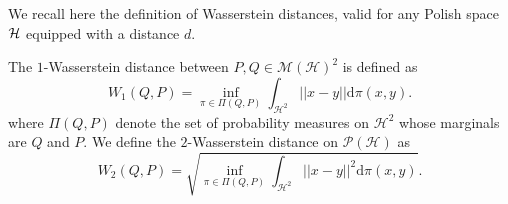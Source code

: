 \begin{noaddcontents}
    We recall here the definition of Wasserstein distances, valid for any Polish space $\mathcal{H}$ equipped with a distance $d$.
    
    \begin{definition}
    \label{def: wasserstein-chap-4}
    The $1$-Wasserstein distance between $P,Q \in \mathcal{M}(\mathcal{H})^2$ is defined as
    \[ W_1(Q,P) = \inf_{\pi \in \Pi(Q,P)} \int_{\mathcal{H}^2} ||x-y||\mathrm{d}\pi(x,y). \]
    where $\Pi(Q,P)$ denote the set of probability measures on $\mathcal{H}^2$ whose marginals are $Q$ and $P$.
    We define the $2$-Wasserstein distance on $\mathcal{P}(\mathcal{H})$ as
    \[ W_2(Q,P) = \sqrt{\inf_{\pi \in \Pi(Q,P)} \int_{\mathcal{H}^2} ||x-y||^2\mathrm{d}\pi(x,y)}. \]
    \end{definition}
    \begin{comment}
    \subsection{Stochastic Gradient Descent.}
    \begin{algorithm}[htbp]
      \begin{algorithmic}[1]
      \State \textbf{Input:} Initial point $\mathbf{h}_1=0$, steps $(\eta_t)_{t\geq 1}$, dataset $\S$\\
      \textbf{For $t=1\cdots T$:}
      \State \hspace{0.7cm}Draw $j_t\sim Unif\LP\LC 1 \cdots m\RC \RP$
      \State \hspace{0.7cm}Update $\mathbf{h}_{t+1} = \mathbf{h}_t - \eta_t \nabla_h\ell(\mathbf{h}_t,\z_{j_t})$
      \State \textbf{return} $\mathbf{h}_{T+1}$
      \end{algorithmic}
      \caption{Stochastic Gradient Descent}
      \label{alg:sgd}
      \end{algorithm}
    

\end{comment}
\end{noaddcontents}
